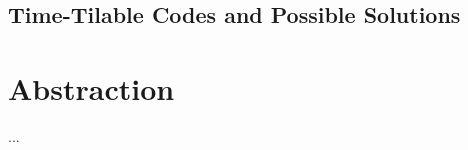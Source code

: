 %
%
%

\subsection{Time-Tilable Codes and Possible Solutions}
%
%
%
%
%
%
%
%


\section{Abstraction}
\label{sec:tiling:lc}
...

